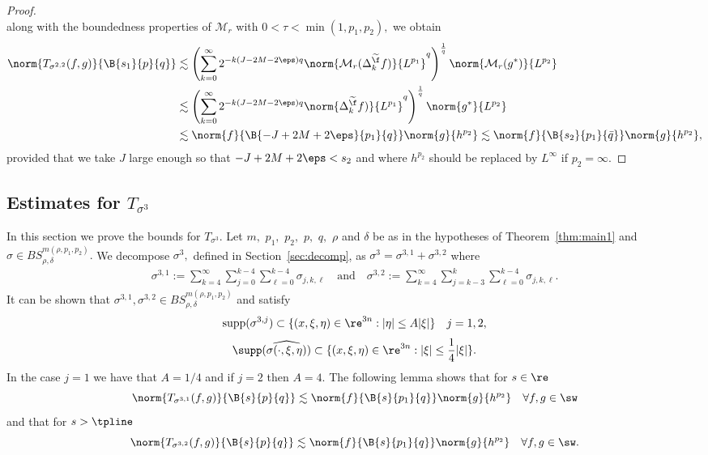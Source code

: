 \begin{proof}
$$$$
along with  the boundedness properties of $\mathcal{M}_r$ with $0<\tau<\min(1,p_1,p_2),$ we obtain
\begin{align*}
\norm{T_{\sigma^{2,2}}(f,g)}{\B{s_1}{p}{q}} & \lesssim \left( \sum\limits_{k=0}^\infty 2^{-k  (J-2M -2\eps)q} \norm{\mathcal{M}_r(\Delta^{\widetilde{\f}}_k f)}{L^{p_1}}^q  \right)^\frac{1}{q}\norm{\mathcal{M}_r(g^*)}{L^{p_2}}\\
& \lesssim \left( \sum\limits_{k=0}^\infty 2^{-k  (J-2M -2\eps)q} \norm{\Delta^{\widetilde{\f}}_k f)}{L^{p_1}}^q  \right)^\frac{1}{q} \norm{g^*}{L^{p_2}}\\
& \lesssim \norm{f}{\B{-J +2M +2\eps}{p_1}{q}} \norm{g}{h^{p_2}} \lesssim  \norm{f}{\B{s_2}{p_1}{\bar{q}}} \norm{g}{h^{p_2}},
\end{align*}
provided that we take $J$ large enough so that $-J +2M +2\eps < s_2$ and where $h^{p_2}$ should be replaced by $L^\infty$ if $p_2=\infty.$
\end{proof}




\subsection{Estimates for $T_{\sigma^3}$}\label{sec:T3}

In this section we prove the bounds for $T_{\sigma^3}$. Let $m,$ $p_1,$ $p_2,$ $p,$ $q,$   $\rho$ and $\delta$ be as in the hypotheses of Theorem~\ref{thm:main1} and $\sigma\in BS^{m(\rho,p_1,p_2)}_{\rho,\delta}.$ We decompose $\sigma^3,$ defined in Section~\ref{sec:decomp}, as $\sigma^3=\sigma^{3,1}+\sigma^{3,2}$ where
\begin{align*}
\sigma^{3,1}:=  \sum\limits_{k=4}^\infty \sum\limits_{j=0}^{k-4} \sum\limits_{\ell =0}^{k-4} \sigma_{j,k,\ell}\quad \text{and}\quad \sigma^{3,2}:= \sum\limits_{k=4}^\infty \sum\limits_{j=k-3}^k \sum\limits_{\ell =0}^{k-4} \sigma_{j,k,\ell}.
\end{align*}
It can be shown that $\sigma^{3,1}, \sigma^{3,2} \in BS^{m(\rho,p_1,p_2)}_{\rho,\delta}$ and satisfy 
\begin{equation*}
\text{supp}(\sigma^{3,j}) \subset \{ (x,\xi,\eta) \in \re^{3n}:|\eta| \leq A |\xi| \} \quad j=1,2,
\end{equation*}
\begin{equation*}
\text{\supp}(\widehat{\sigma(\cdot,\xi,\eta)}) \subset \{(x,\xi,\eta) \in \re^{3n}: |\xi| \leq \frac{1}{4} |\xi| \}.
\end{equation*}
In the case $j=1$ we have that $A=1/4$ and if $j=2$ then $A = 4$.
The following lemma shows that for $s\in\re$
\begin{equation}\label{eq:T31}
\norm{T_{\sigma^{3,1}}(f,g)}{\B{s}{p}{q}}\lesssim \norm{f}{\B{s}{p_1}{q}}\norm{g}{h^{p_2}} \quad \forall f,g\in \sw
\end{equation}
and that for $s>\tpline$
\begin{equation}\label{eq:T32}
\norm{T_{\sigma^{3,2}}(f,g)}{\B{s}{p}{q}}\lesssim \norm{f}{\B{s}{p_1}{q}}\norm{g}{h^{p_2}} \quad \forall f,g\in \sw.
\end{equation}



